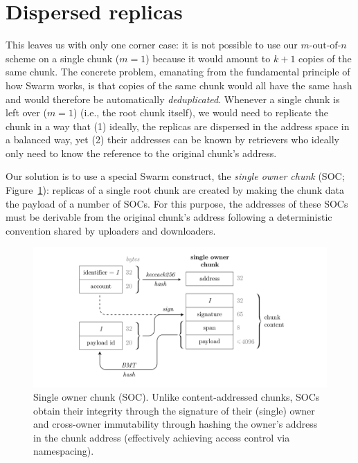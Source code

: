 \documentclass[manuscript,screen,review]{acmart}
\begin{document}
\section{Dispersed replicas}
\label{sec:dispersed-replicas}

This leaves us with only one corner case: it is not possible to use our $m\text{-out-of-}n$ scheme on a single chunk ($m=1$) because it would amount to $k+1$ copies of the same chunk. The concrete problem, emanating from the fundamental principle of how Swarm works, is that copies of the same chunk would all have the same hash and would therefore be automatically \emph{deduplicated}. Whenever a single chunk is left over ($m=1$) (i.e., the root chunk itself), we would need to replicate the chunk in a way that (1) ideally, the replicas are dispersed in the address space in a balanced way, yet (2) their addresses can be known by retrievers who ideally only need to know the reference to the original chunk's address.

 
Our solution is to use a special Swarm construct, the \emph{single owner chunk} (SOC; Figure~\ref{fig:soc}): replicas of a single root chunk are created by making the chunk data the payload of a number of SOCs. For this purpose, the addresses of these SOCs must be derivable from the original chunk's address following a deterministic convention shared by uploaders and downloaders.

\begin{figure}[!ht]
  \centering
  \includegraphics[width=\textwidth]{figs/single-owner-chunk.pdf}
  \caption{Single owner chunk (SOC). Unlike content-addressed chunks, SOCs obtain their integrity through the signature of their (single) owner and cross-owner immutability through hashing the owner's address in the chunk address (effectively achieving access control via namespacing).}
   \label{fig:soc}
  \end{figure}
\end{document}
